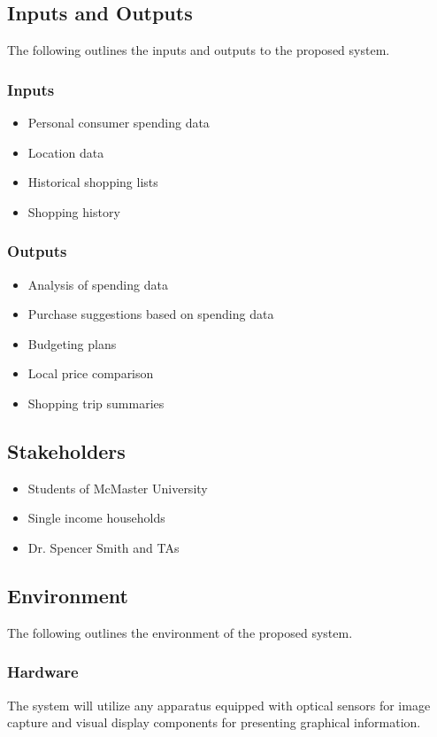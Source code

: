 \documentclass{article}
\begin{document}
\subsection{Inputs and Outputs}
The following outlines the inputs and outputs to the proposed system.
\subsubsection{Inputs}
    \begin{itemize}
        \item Personal consumer spending data
        \item Location data
        \item Historical shopping lists
        \item Shopping history
    \end{itemize}

\subsubsection{Outputs}
    \begin{itemize}
        \item Analysis of spending data
        \item Purchase suggestions based on spending data
        \item Budgeting plans
        \item Local price comparison
        \item Shopping trip summaries
    \end{itemize}

\subsection{Stakeholders}

\begin{itemize}
    \item Students of McMaster University
    \item Single income households
    \item Dr. Spencer Smith and TAs
\end{itemize}

\subsection{Environment}
The following outlines the environment of the proposed system.
\subsubsection{Hardware} 
The system will utilize any apparatus equipped with optical sensors for image capture and visual display components for presenting graphical information.
\end{document}

